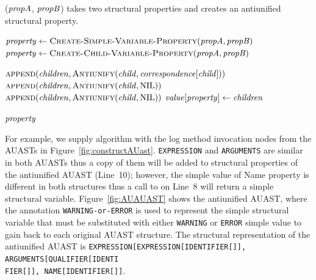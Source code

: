 \begin{algorithm}
 \caption{($\mathit{propA}$, $\mathit{propB}$) takes two structural properties and creates an antiunified structural property.}
  \label{AntiUnify}
  \begin{algorithmic}[1]
\AntiUnifyProperty
{}

	      \State $\mathit{property} \gets  \textsc{Create-Simple-Variable-Property}(\mathit{propA},\mathit{propB})$
			\State $\mathit{property} \gets  \textsc{Create-Child-Variable-Property}(\mathit{propA},\mathit{propB})$
	
	  \State $\textsc{append}(\mathit{children},\textsc{Antiunify}(\mathit{child}, \mathit{correspondence}[\mathit{child}]))$
	   \Else 	
	    \State $\textsc{append}(\mathit{children},\textsc{Antiunify}(\mathit{child}, \textrm{NIL}))$
	    \EndIf
      \EndFor
	    \State $\textsc{append}(\mathit{children},\textsc{Antiunify}(\mathit{child}, \textrm{NIL}))$
	    \EndIf
      \EndFor
		\State $ \mathit{value}[\mathit{property}] \gets\mathit{children} $

    \EndIf
\Return $\mathit{property}$
\end{algorithmic}
\end{algorithm}

For example, we supply  algorithm with the log method invocation nodes from the AUASTs in Figure~\ref{fig:constructAUast}. \texttt{EXPRESSION} and \texttt{ARGUMENTS} are similar in both AUASTs thus a copy of them will be added to structural properties of the antiunified AUAST (Line~10); however, the simple value of Name property is different in both structures thus a call to  on Line~8 will return a simple structural variable. Figure~\ref{fig:AUAUAST} shows the antiunified AUAST, where the annotation \texttt{WARNING-or-ERROR} is used to represent the simple structural variable that must be substituted with either \texttt{WARNING} or \texttt{ERROR} simple value to gain back to each original AUAST structure. The structural representation of the antiunified AUAST is \texttt{EXPRESSION[EXPRESSION[IDENTIFIER[]], ARGUMENTS[QUALIFIER[IDENTI\\FIER[]], NAME[IDENTIFIER[]]}.

